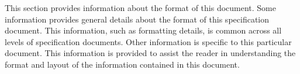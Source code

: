 
This section provides information about the format of this document.
Some information provides general details about the format of this specification document.
This information, such as formatting details, is common across all levels of specification documents.
Other information is specific to this particular document.
This information is provided to assist the reader in understanding the format and layout of the information contained in this document.

